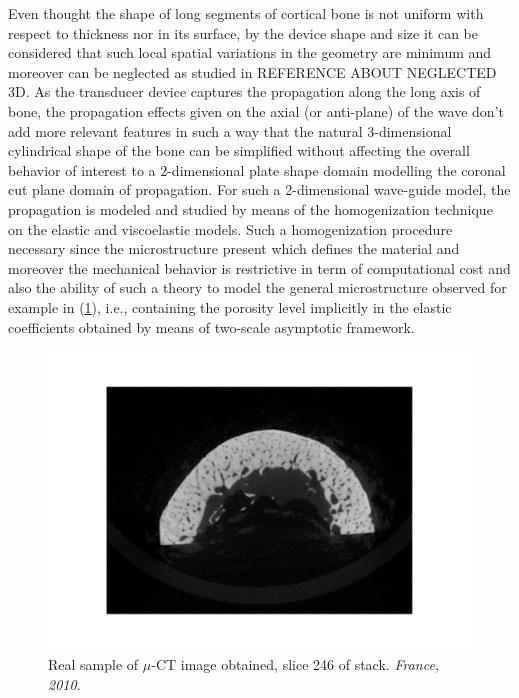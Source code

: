 Even thought the shape of long segments of cortical bone is not uniform with respect to thickness nor in its surface, by the device shape and size it can be considered that such local spatial variations in the geometry are minimum and moreover can be neglected as studied in REFERENCE ABOUT NEGLECTED 3D.
As the transducer device captures the propagation along the long axis of bone, the propagation effects given on the axial (or anti-plane) of the wave don't add more relevant features \cite{Foiret2014} in such a way that the natural 3-dimensional cylindrical shape of the bone can be simplified without affecting the overall behavior of interest to a 2-dimensional plate shape domain modelling the coronal cut plane domain of propagation.
For such a 2-dimensional wave-guide model, the propagation is modeled and studied by means of the homogenization technique on the elastic and viscoelastic models. Such a homogenization procedure necessary since the microstructure present which defines the material and moreover the mechanical behavior is restrictive in term of computational cost and also the ability of such a theory to model the general microstructure observed for example in (\ref{muCT-Image}), i.e., containing the porosity level implicitly in the elastic coefficients obtained by means of two-scale asymptotic framework.

\begin{figure}[!h]
	\centering
	\includegraphics[scale=.5]{images/ImgExt/246-2010_rec0964.pdf}
	\caption{Real sample of $\mu$-CT image obtained, slice 246 of stack. \textit{France, 2010}.}
	\label{muCT-Image}
\end{figure}




